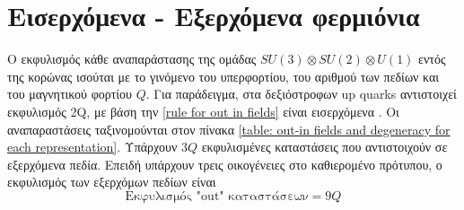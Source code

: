 \section{Εισερχόμενα - Εξερχόμενα φερμιόνια}
Ο εκφυλισμός κάθε αναπαράστασης της ομάδας $SU(3)\otimes SU(2)\otimes U(1)$ εντός της κορώνας ισούται με το γινόμενο του υπερφορτίου, του αριθμού των πεδίων και του μαγνητικού φορτίου $Q$. Για παράδειγμα, στα δεξιόστροφων up quarks αντιστοιχεί εκφυλισμός 2Q, με βάση την \eqref{rule for out in fields} είναι εισερχόμενα \cite{Maldacena_2021}. Οι αναπαραστάσεις ταξινομούνται στον πίνακα \ref{table: out-in fields and degeneracy for each representation}. Υπάρχουν $3Q$ εκφυλισμένες καταστάσεις που αντιστοιχούν σε εξερχόμενα πεδία. Επειδή υπάρχουν τρεις οικογένειες στο καθιερομένο πρότυπου, ο εκφυλισμός των εξερχόμων πεδίων είναι
\begin{equation}\label{degeneracy of out fields}
    \text{Εκφυλισμός "out" καταστάσεων}=9Q
\end{equation}

